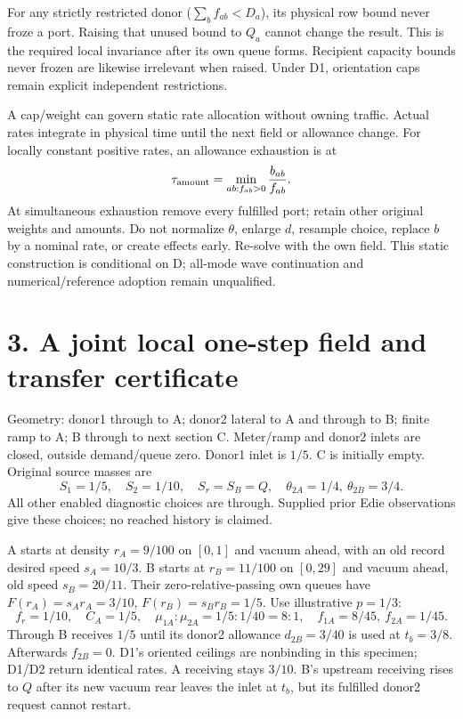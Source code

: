 \documentclass[11pt,a4paper]{article}
\begin{document}
For any strictly restricted donor ($\sum_bf_{ab}<D_a$), its physical row bound
never froze a port. Raising that unused bound to $Q_a$ cannot change the
result. This is the required local invariance after its own queue forms.
Recipient capacity bounds never frozen are likewise irrelevant when raised.
Under D1, orientation caps remain explicit independent restrictions.

A cap/weight can govern static rate allocation without owning traffic.
Actual rates integrate in physical time until the next field or allowance
change. For locally constant positive rates, an allowance exhaustion is at
\begin{equation}
 \tau_{\rm amount}=\min_{ab:f_{ab}>0}\frac{b_{ab}}{f_{ab}}.
\end{equation}
At simultaneous exhaustion remove every fulfilled port; retain other original
weights and amounts. Do not normalize $\theta$, enlarge $d$, resample choice,
replace $b$ by a nominal rate, or create effects early. Re-solve with the
own field. This static construction is conditional on D; all-mode wave
continuation and numerical/reference adoption remain unqualified.

\newpage
\section*{3. A joint local one-step field and transfer certificate}
Geometry: donor1 through to A; donor2 lateral to A and through to B; finite
ramp to A; B through to next section C. Meter/ramp and donor2 inlets are
closed, outside demand/queue zero. Donor1 inlet is $1/5$. C is initially
empty. Original source masses are
\begin{equation}
 S_1=1/5,\quad S_2=1/10,\quad S_r=S_B=Q,\quad
 \theta_{2A}=1/4,\ \theta_{2B}=3/4.
\end{equation}
All other enabled diagnostic choices are through. Supplied prior Edie
observations give these choices; no reached history is claimed.

A starts at density $r_A=9/100$ on $[0,1]$ and vacuum ahead, with an old
record desired speed $s_A=10/3$. B starts at $r_B=11/100$ on $[0,29]$ and
vacuum ahead, old speed $s_B=20/11$. Their zero-relative-passing own queues
have $F(r_A)=s_A r_A=3/10$, $F(r_B)=s_Br_B=1/5$. Use illustrative $p=1/3$:
\begin{equation}
 f_r=1/10,\quad C_A=1/5,\quad\mu_{1A}:\mu_{2A}=1/5:1/40=8:1,
 \quad f_{1A}=8/45,\ f_{2A}=1/45.
\end{equation}
Through B receives $1/5$ until its donor2 allowance $d_{2B}=3/40$ is used at
$t_b=3/8$. Afterwards $f_{2B}=0$. D1's oriented ceilings are nonbinding in
this specimen; D1/D2 return identical rates. A receiving stays $3/10$.
B's upstream receiving rises to $Q$ after its new vacuum rear leaves the
inlet at $t_b$, but its fulfilled donor2 request cannot restart.
\end{document}
